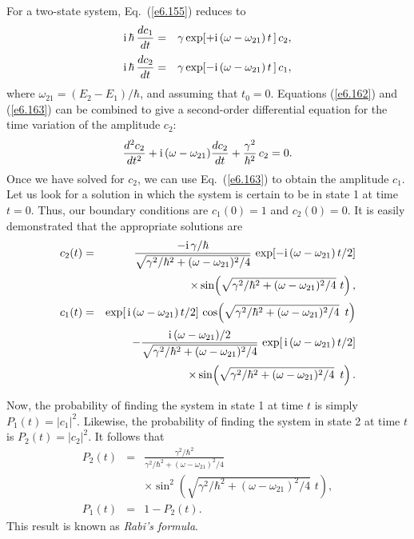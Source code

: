 For a two-state system, Eq.~(\ref{e6.155}) reduces to
\begin{eqnarray}\label{e6.162}
{\rm i} \,\hbar\, \frac{d c_1}{dt} &=& \gamma \exp[+{\rm i}\,
(\omega-\omega_{21})\,t\,]\,c_2,\\[0.5ex]
{\rm i}\,\hbar\, \frac{d c_2}{dt} &=& \gamma  \exp[-{\rm i}\,
(\omega-\omega_{21})\,t\,]\,c_1,\label{e6.163}
\end{eqnarray}
where $\omega_{21}  = (E_2 - E_1)/\hbar$, and assuming that $t_0=0$. Equations (\ref{e6.162}) and 
(\ref{e6.163}) can be combined to give a second-order differential equation
for the time variation of the amplitude $c_2$:
\begin{equation}
\frac{d^2 c_2}{dt^2} + {\rm i}\,(\omega-\omega_{21})\frac{d c_2}{dt} + 
\frac{\gamma^2}{\hbar^2} \,c_2 = 0.
\end{equation}
Once we have solved for $c_2$, we can use Eq.~(\ref{e6.163}) to obtain the 
amplitude $c_1$. Let us look for a solution in which the system is
certain to be in state 1 at time $t=0$. Thus, our boundary
conditions are $c_1(0) = 1$ and $c_2(0) = 0$. It is easily
demonstrated that the appropriate solutions are
\begin{eqnarray}
c_2(t) &=& \frac{-{\rm i}\, \gamma/\hbar}
{\sqrt{\gamma^2/\hbar^2 + (\omega-\omega_{21})^2/4}}\,
\exp[-{\rm i}\,(\omega-\omega_{21})\,t/2]\nonumber\\[0.5ex]
&&\times\sin\!\left(\sqrt{\gamma^2/\hbar^2+(\omega-\omega_{21})^2/4}\,\,t\right),
\\[0.5ex]
c_1(t)&=& \exp[\,{\rm i}\,(\omega-\omega_{21})\,t/2]\,\cos\!\left(
\sqrt{\gamma^2/\hbar^2+(\omega-\omega_{21})^2/4}\,\,\,t\right)\nonumber\\[0.5ex]
&&- \frac{{\rm i}\,(\omega-\omega_{21})/2 }{\sqrt{\gamma^2/\hbar^2 + 
(\omega-\omega_{21})^2/4}} \,\exp[\,{\rm i}\,(\omega-\omega_{21})\,t/2]
\nonumber
\\[0.5ex]
&&\times\sin\!\left(
\sqrt{\gamma^2/\hbar^2+(\omega-\omega_{21})^2/4}\,\,\,t\right).
\end{eqnarray}

Now, the probability of finding the system in state 1 at time $t$ is
simply $P_1(t) = |c_1|^2$. Likewise, the probability of finding the
system in state 2 at time $t$ is $P_2(t) = |c_2|^2$. 
It follows that
\begin{eqnarray}\label{e6.167}
P_2(t) &=& \frac{\gamma^2/\hbar^2}{ \gamma^2/\hbar^2 + 
(\omega-\omega_{21})^2/4} \nonumber\\[0.5ex]
&&\times \sin^2\!\left(\sqrt{\gamma^2/\hbar^2+
(\omega-\omega_{21})^2/4}\,\,t\right),\\[0.5ex]
P_1(t) &=& 1 - P_2(t).
\end{eqnarray}
This result is known as {\em Rabi's formula}.

